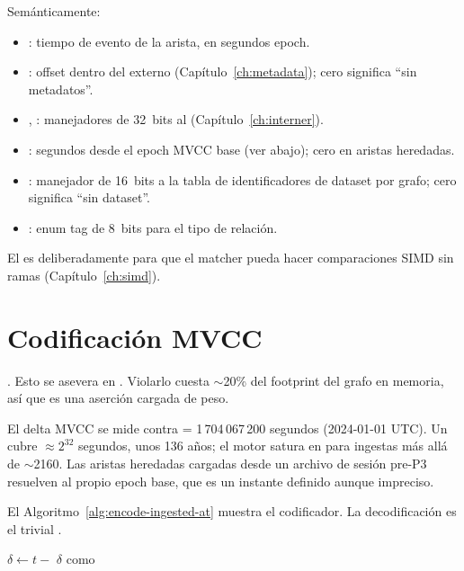 Semánticamente:
\begin{itemize}
    \item {}: tiempo de evento de la arista, en
        segundos epoch.
    \item {}: offset dentro del
         externo (Capítulo~\ref{ch:metadata});
        cero significa ``sin metadatos''.
    \item {}, : manejadores de
        32~bits al 
        (Capítulo~\ref{ch:interner}).
    \item {}: segundos desde el epoch MVCC
        base (ver abajo); cero en aristas heredadas.
    \item {}: manejador de 16~bits a la tabla
         de identificadores de dataset por grafo;
        cero significa ``sin dataset''.
    \item {}: enum tag de 8~bits para el tipo
        de relación.
\end{itemize}

El  es deliberadamente  para que el
matcher pueda hacer comparaciones SIMD sin ramas
(Capítulo~\ref{ch:simd}).

\section{Codificación MVCC}

\begin{invariant}
. Esto se asevera en
. Violarlo cuesta $\sim$20\% del
footprint del grafo en memoria, así que es una aserción cargada
de peso.
\end{invariant}

El delta MVCC se mide contra
 = 1\,704\,067\,200 segundos (2024-01-01
UTC). Un  cubre $\approx 2^{32}$ segundos, unos 136
años; el motor satura en  para ingestas más allá
de $\sim$2160. Las aristas heredadas cargadas desde un archivo de
sesión pre-P3 resuelven al propio epoch base, que es un instante
definido aunque impreciso.

El Algoritmo~\ref{alg:encode-ingested-at} muestra el codificador.
La decodificación es el trivial .

\begin{algorithm}
\caption{\textsc{Codificar-Ingested-At}}\label{alg:encode-ingested-at}
$\delta \gets t - $ \;
\Return $\delta$ como \;
\end{algorithm}

